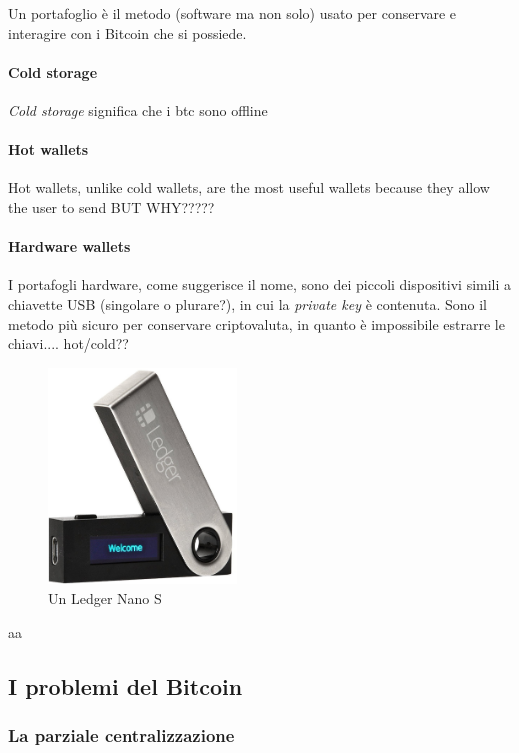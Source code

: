\documentclass {article}
\begin{document}
Un portafoglio è il metodo (software ma non solo) usato per conservare e interagire con i Bitcoin che si possiede.


\paragraph {Cold storage}


\textit{Cold storage} significa che i btc sono offline


\paragraph {Hot wallets}


Hot wallets, unlike cold wallets, are the most useful wallets because they allow the user to send BUT WHY?????


\paragraph {Hardware wallets}


I portafogli hardware, come suggerisce il nome, sono dei piccoli dispositivi simili a chiavette USB (singolare o plurare?), in cui la \textit{private key} è contenuta.
Sono il metodo più sicuro per conservare criptovaluta, in quanto è impossibile estrarre le chiavi.... hot/cold??

\vspace {0.5cm}
\begin{figure}[h]
\includegraphics [width = 5cm] {ledger.jpg}
\centering
\caption {Un Ledger Nano S}
\end{figure}
\vspace {0.2cm}
\noindent
%
aa


\subsection {I problemi del Bitcoin}


\subsubsection {La parziale centralizzazione}
\end{document}

